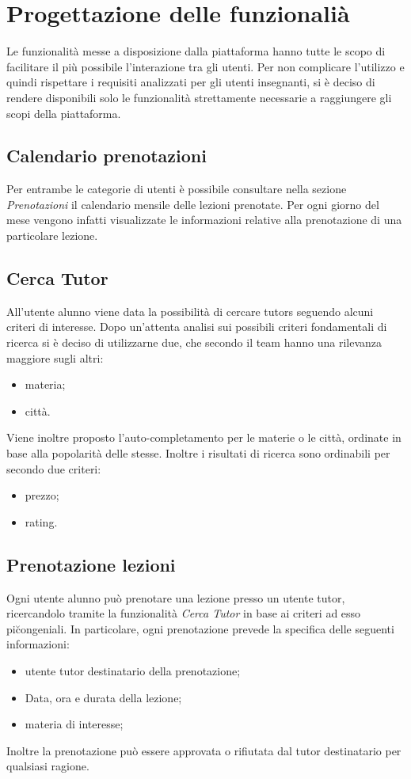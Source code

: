 \documentclass[12pt]{article}
\begin{document}
\section{Progettazione delle funzionali\`a}
Le funzionalit\`a messe a disposizione dalla piattaforma hanno tutte le scopo di facilitare il pi\`u possibile l'interazione tra gli utenti. Per non complicare l'utilizzo e quindi rispettare i requisiti analizzati per gli utenti insegnanti, si \`e deciso di rendere disponibili solo le funzionalit\`a strettamente necessarie a raggiungere gli scopi della piattaforma.

\subsection{Calendario prenotazioni}
Per entrambe le categorie di utenti \`e possibile consultare nella sezione \emph{Prenotazioni} il calendario mensile delle lezioni prenotate. Per ogni giorno del mese vengono infatti visualizzate le informazioni relative alla prenotazione di una particolare lezione.

\subsection{Cerca Tutor}
All'utente alunno viene data la possibilit\`a di cercare tutors seguendo alcuni criteri di interesse. Dopo un'attenta analisi sui possibili criteri fondamentali di ricerca si \`e deciso di utilizzarne due, che secondo il team hanno una rilevanza maggiore sugli altri:
\begin{itemize}
	\item materia;
	\item citt\`a.
\end{itemize}
Viene inoltre proposto l'auto-completamento per le materie o le citt\`a, ordinate in base alla popolarit\`a delle stesse. Inoltre i risultati di ricerca sono ordinabili per secondo due criteri:
\begin{itemize}
	\item prezzo;
	\item rating.
\end{itemize}

\subsection{Prenotazione lezioni}
Ogni utente alunno pu\`o prenotare una lezione presso un utente tutor, ricercandolo tramite la funzionalit\`a \emph{Cerca Tutor} in base ai criteri ad esso pi\u congeniali. In particolare, ogni prenotazione prevede la specifica delle seguenti informazioni:
\begin{itemize}
	\item utente tutor destinatario della prenotazione;
	\item Data, ora e durata della lezione;
	\item materia di interesse;
\end{itemize}
Inoltre la prenotazione pu\`o essere approvata o rifiutata dal tutor destinatario per qualsiasi ragione.
\end{document}

